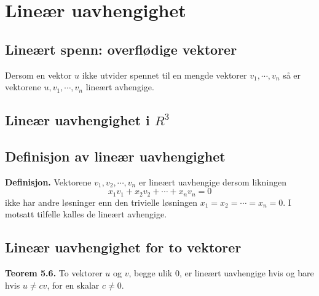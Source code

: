 \documentclass{article}
\begin{document}
\clearpage
\section{Lineær uavhengighet}

\subsection{Lineært spenn: overflødige vektorer}
Dersom en vektor $u$ ikke utvider spennet til en mengde vektorer $v_1, \cdots, v_n$ så er vektorene $u, v_1, \cdots, v_n$ lineært avhengige.

\subsection{Lineær uavhengighet i $R^3$}


\subsection{Definisjon av lineær uavhengighet}
\textbf{Definisjon.} Vektorene $v_1, v_2, \cdots, v_n$ er lineært uavhengige dersom likningen
\[ x_1 v_1 + x_2 v_2 + \cdots + x_n v_n = 0 \]
ikke har andre løsninger enn den trivielle løsningen $x_1 = x_2 = \cdots = x_n = 0$. I motsatt tilfelle kalles de lineært avhengige.


\subsection{Lineær uavhengighet for to vektorer}
\textbf{Teorem 5.6.} To vektorer $u$ og $v$, begge ulik $0$, er lineært uavhengige hvis og bare hvis $u \neq cv$, for en skalar $c \neq 0$.
\end{document}

